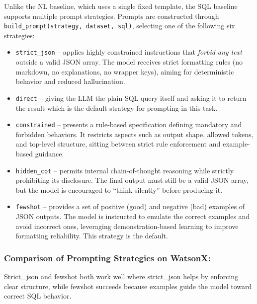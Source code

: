 \documentclass[12pt]{article}
\begin{document}
Unlike the NL baseline, which uses a single fixed template, the SQL baseline supports multiple prompt strategies.  
Prompts are constructed through \verb|build_prompt(strategy, dataset, sql)|, selecting one of the following six strategies:

\begin{itemize}
    \item \verb|strict_json| – applies highly constrained instructions that \emph{forbid any text} outside a valid JSON array.  
    The model receives strict formatting rules (no markdown, no explanations, no wrapper keys), aiming for deterministic behavior and reduced hallucination.  
    

    \item \verb|direct| – giving the LLM the plain SQL query itself and asking it to return the result which is the default strategy for prompting in this task.   
    

    \item \verb|constrained| – presents a rule-based specification defining mandatory and forbidden behaviors.  
    It restricts aspects such as output shape, allowed tokens, and top-level structure, sitting between strict rule enforcement and example-based guidance.  
    

    \item \verb|hidden_cot| – permits internal chain-of-thought reasoning while strictly prohibiting its disclosure.  
    The final output must still be a valid JSON array, but the model is encouraged to “think silently” before producing it.  
   

    \item \verb|fewshot| – provides a set of positive (good) and negative (bad) examples of JSON outputs.  
    The model is instructed to emulate the correct examples and avoid incorrect ones, leveraging demonstration-based learning to improve formatting reliability.  
    This strategy is the default.  
    
    
\end{itemize}

\subsubsection{Comparison of Prompting Strategies on WatsonX:}
 
Strict\_json and fewshot both work well where strict\_json helps by enforcing clear structure, while fewshot succeeds because examples guide the model toward correct SQL behavior.
\end{document}
